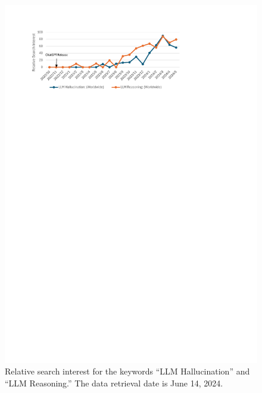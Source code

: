 \documentclass[lettersize,journal]{IEEEtran}
\begin{document}
\begin{figure}[h]
    \centering
    \includegraphics[width=\linewidth]{figures/trend.pdf}
    \caption{Relative search interest for the keywords ``LLM Hallucination'' and ``LLM Reasoning.'' The data retrieval date is June 14, 2024.}
    \label{fig:trend}
\end{figure}
\end{document}
